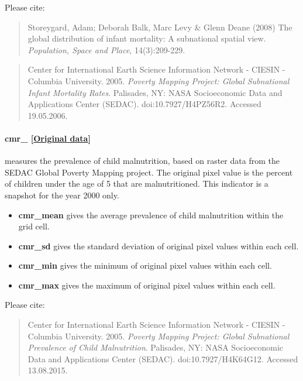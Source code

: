 \documentclass[]{book}
\begin{document}
Please cite:

\begin{quote}
Storeygard, Adam; Deborah Balk, Marc Levy \& Glenn Deane (2008) The
global distribution of infant mortality: A subnational spatial view.
\emph{Population, Space and Place}, 14(3):209-229.
\end{quote}

\begin{quote}
Center for International Earth Science Information Network - CIESIN -
Columbia University. 2005. \emph{Poverty Mapping Project: Global
Subnational Infant Mortality Rates}. Palisades, NY: NASA Socioeconomic
Data and Applications Center (SEDAC). doi:10.7927/H4PZ56R2. Accessed
19.05.2006.
\end{quote}

\paragraph{cmr\_
{[}\href{http://sedac.ciesin.columbia.edu/data/set/povmap-global-subnational-prevalence-child-malnutrition}{Original
data}{]}}\label{cmr-}

measures the prevalence of child malnutrition, based on raster data from
the SEDAC Global Poverty Mapping project. The original pixel value is
the percent of children under the age of 5 that are malnutritioned. This
indicator is a snapshot for the year 2000 only.

\begin{itemize}
\itemsep1pt\parskip0pt
\item
  \textbf{cmr\_mean} gives the average prevalence of child malnutrition
  within the grid cell.
\item
  \textbf{cmr\_sd} gives the standard deviation of original pixel values
  within each cell.
\item
  \textbf{cmr\_min} gives the minimum of original pixel values within
  each cell.
\item
  \textbf{cmr\_max} gives the maximum of original pixel values within
  each cell.
\end{itemize}

Please cite:

\begin{quote}
Center for International Earth Science Information Network - CIESIN -
Columbia University. 2005. \emph{Poverty Mapping Project: Global
Subnational Prevalence of Child Malnutrition}. Palisades, NY: NASA
Socioeconomic Data and Applications Center (SEDAC).
doi:10.7927/H4K64G12. Accessed 13.08.2015.
\end{quote}
\end{document}

